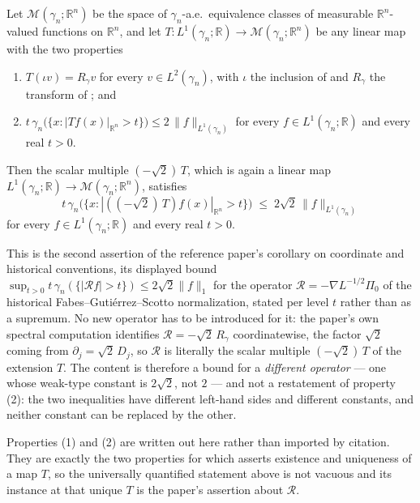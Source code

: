 \begin{corollary}[Endpoint bound for the historical spectral normalization $\mathcal{R} = -\sqrt2\,R_\gamma$]
Let $\mathcal{M}(\gamma_n;\mathbb{R}^n)$ be the space of $\gamma_n$-a.e.\
equivalence classes of measurable $\mathbb{R}^n$-valued functions on
$\mathbb{R}^n$, and let
$T : L^1(\gamma_n;\mathbb{R}) \to \mathcal{M}(\gamma_n;\mathbb{R}^n)$ be any
linear map with the two properties
\begin{enumerate}
\item $T(\iota v) = R_\gamma v$ for every $v \in L^2(\gamma_n)$, with $\iota$ the
inclusion of \noderef{ToL1} and $R_\gamma$ the transform of
; and
\item $t\,\gamma_n\bigl(\{x : |Tf(x)|_{\mathbb{R}^n} > t\}\bigr)
       \leq 2\,\|f\|_{L^1(\gamma_n)}$
for every $f \in L^1(\gamma_n;\mathbb{R})$ and every real $t > 0$.
\end{enumerate}
Then the scalar multiple $(-\sqrt2)\,T$, which is again a linear map
$L^1(\gamma_n;\mathbb{R}) \to \mathcal{M}(\gamma_n;\mathbb{R}^n)$, satisfies
\[
  t\,\gamma_n\bigl(\{x : |((-\sqrt2)\,T)f(x)|_{\mathbb{R}^n} > t\}\bigr)
    \;\leq\; 2\sqrt2\,\|f\|_{L^1(\gamma_n)}
\]
for every $f \in L^1(\gamma_n;\mathbb{R})$ and every real $t > 0$.

This is the second assertion of the reference paper's corollary on coordinate and
historical conventions, its displayed bound
$\sup_{t>0} t\,\gamma_n(\{|\mathcal{R}f|>t\}) \leq 2\sqrt2\|f\|_1$ for the
operator $\mathcal{R} = -\nabla L^{-1/2}\Pi_0$ of the historical
Fabes--Guti\'errez--Scotto normalization, stated per level $t$ rather than as a
supremum.  No new operator has to be introduced for it: the paper's own spectral
computation identifies $\mathcal{R} = -\sqrt2\,R_\gamma$ coordinatewise, the
factor $\sqrt2$ coming from $\partial_j = \sqrt2\,D_j$, so $\mathcal{R}$ is
literally the scalar multiple $(-\sqrt2)\,T$ of the extension $T$.  The content
is therefore a bound for a \emph{different operator} --- one whose weak-type
constant is $2\sqrt2$, not $2$ --- and not a restatement of property (2): the two
inequalities have different left-hand sides and different constants, and neither
constant can be replaced by the other.

Properties (1) and (2) are written out here rather than imported by citation.
They are exactly the two properties for which \noderef{EndpointTheorem} asserts
existence and uniqueness of a map $T$, so the universally quantified statement
above is not vacuous and its instance at that unique $T$ is the paper's
assertion about $\mathcal{R}$.
\end{corollary}
